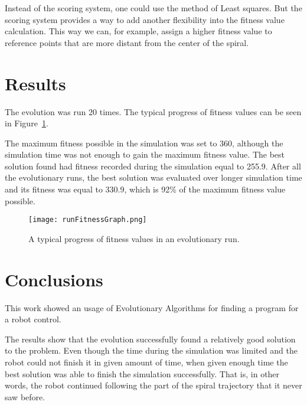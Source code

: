 \documentclass{ExcelAtFIT}
\begin{document}
Instead of the scoring system, one could use the method of Least squares.
But the scoring system provides a way to add another flexibility into the fitness value calculation.
This way we can, for example, assign a higher fitness value to reference points that are more distant from the center of the spiral.




\section{Results}
The evolution was run 20 times.
The typical progress of fitness values can be seen in Figure~\ref{fig:FitnessGraph}.

The maximum fitness possible in the simulation was set to 360, although the simulation time was not enough to gain the maximum fitness value.
The best solution found had fitness recorded during the simulation equal to 255.9.
After all the evolutionary runs, the best solution was evaluated over longer simulation time and its fitness was equal to 330.9, which is 92\% of the maximum fitness value possible.

\begin{figure}[h]
	\centering
	{\texttt{[image: runFitnessGraph.png]}}
	\caption{
		A typical progress of fitness values in an evolutionary run.
	}
	\label{fig:FitnessGraph}
\end{figure}


\section{Conclusions}
\label{sec:Conclusions}

This work showed an usage of Evolutionary Algorithms for finding a program for a robot control.

The results show that the evolution successfully found a relatively good solution to the problem.
Even though the time during the simulation was limited and the robot could not finish it in given amount of time, when given enough time the best solution was able to finish the simulation successfully.
That is, in other words, the robot continued following the part of the spiral trajectory that it never saw before.
\end{document}
